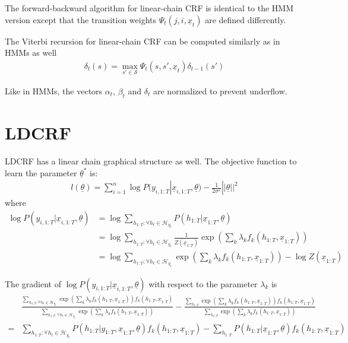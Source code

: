 The forward-backward algorithm for linear-chain CRF is identical to the HMM
version except that the transition weights $\Psi_t(j, i, \underline{x}_t)$ are
defined differently.

The Viterbi recursion for linear-chain CRF can be computed similarly as in HMMs
as well
\begin{align*}
\delta_t(s) = \max_{s'\in \mathcal{S}}\Psi_t(s, s',
\underline{x}_t)\delta_{t-1}(s')
\end{align*}

Like in HMMs, the vectors $\alpha_t$, $\beta_t$ and $\delta_t$ are normalized to
prevent underflow.

\section{LDCRF}
LDCRF has a linear chain graphical structure as well. The objective function to
learn the parameter $\underline{\theta}^*$ is:
\begin{align*}
l(\underline{\theta}) = \sum_{i=1}^n \log P(y_{i,
1:T}|\underline{x}_{i, 1:T}, \underline{\theta}) -
\frac{1}{2\sigma^2}||\underline{\theta}||^2
\end{align*}
where
\begin{align*}
\log P(y_{i,
1:T}|\underline{x}_{i, 1:T}, \underline{\theta}) &= \log \sum_{h_{1:T}:\forall
h_t\in \mathcal{H}_{y_t}}P(h_{1:T}|\underline{x}_{1:T}, \underline{\theta}) \\
&= \log \sum_{h_{1:T}:\forall
h_t\in \mathcal{H}_{y_t}} \frac{1}{Z(\underline{x}_{1:T})}\exp \left(\sum_k
\lambda_k f_k(h_{1:T}, \underline{x}_{1:T})\right) \\
&= \log \sum_{h_{1:T}:\forall
h_t\in \mathcal{H}_{y_t}} \exp \left(\sum_k
\lambda_k f_k(h_{1:T},
\underline{x}_{1:T})\right) - \log Z(\underline{x}_{1:T})
\end{align*}

The gradient of $\log P(y_{i,
1:T}|\underline{x}_{i, 1:T}, \underline{\theta})$ with respect to the
parameter $\lambda_k$ is
\begin{align*}
&\frac{\sum\limits_{h_{1:T}:\forall
h_t\in \mathcal{H}_{y_t}} \exp \left(\sum\limits_k
\lambda_k f_k(h_{1:T},
\underline{x}_{1:T})\right)f_k(h_{1:T},
\underline{x}_{1:T})}{\sum\limits_{h_{1:T}:\forall
h_t\in \mathcal{H}_{y_t}} \exp \left(\sum\limits_k
\lambda_k f_k(h_{1:T},
\underline{x}_{1:T})\right)} - \frac{\sum
\limits_{h_{1:T}}\exp \left(\sum\limits_k
\lambda_k f_k(h_{1:T},
\underline{x}_{1:T})\right)f_k(h_{1:T},
\underline{x}_{1:T})}{\sum\limits_{h_{1:T}}\exp \left(\sum\limits_k
\lambda_k f_k(h_{1:T},
\underline{x}_{1:T})\right)}\\
=&\sum_{h_{1:T}:\forall
h_t\in \mathcal{H}_{y_t}}P(h_{1:T}|y_{1:T},
\underline{x}_{1:T},\underline{\theta})f_k(h_{1:T},
\underline{x}_{1:T}) - \sum_{h_{1:T}}P(h_{1:T}|
\underline{x}_{1:T},\underline{\theta})f_k(h_{1:T},
\underline{x}_{1:T})
\end{align*}
